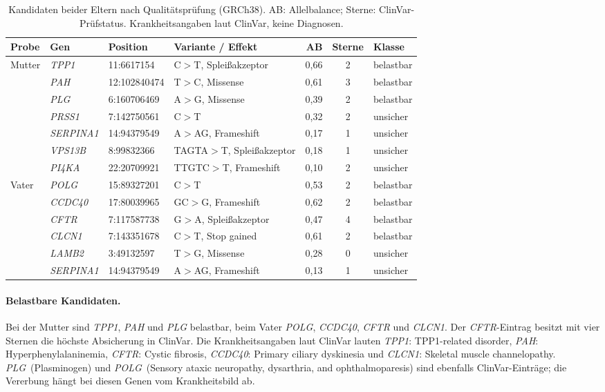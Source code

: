 \documentclass[10pt,a4paper,twocolumn]{article}
\newcommand{\gene}[1]{\textit{#1}}
\begin{document}
\begin{table}[t]
\centering
\small
\caption{Kandidaten beider Eltern nach Qualit\"atspr\"ufung (GRCh38). AB: Allelbalance; Sterne: ClinVar-Pr\"ufstatus. Krankheitsangaben laut ClinVar, keine Diagnosen.}
\label{tab:kand}
\begin{tabular}{@{}llllrcl@{}}
\toprule
Probe & Gen & Position & Variante / Effekt & AB & Sterne & Klasse\\
\midrule
Mutter & \gene{TPP1} & 11:6617154 & C$>$T, Spleißakzeptor & 0,66 & 2 & belastbar\\
 & \gene{PAH} & 12:102840474 & T$>$C, Missense & 0,61 & 3 & belastbar\\
 & \gene{PLG} & 6:160706469 & A$>$G, Missense & 0,39 & 2 & belastbar\\
 & \gene{PRSS1} & 7:142750561 & C$>$T & 0,32 & 2 & unsicher\\
 & \gene{SERPINA1} & 14:94379549 & A$>$AG, Frameshift & 0,17 & 1 & unsicher\\
 & \gene{VPS13B} & 8:99832366 & TAGTA$>$T, Spleißakzeptor & 0,18 & 1 & unsicher\\
 & \gene{PI4KA} & 22:20709921 & TTGTC$>$T, Frameshift & 0,10 & 2 & unsicher\\
\addlinespace
Vater & \gene{POLG} & 15:89327201 & C$>$T & 0,53 & 2 & belastbar\\
 & \gene{CCDC40} & 17:80039965 & GC$>$G, Frameshift & 0,62 & 2 & belastbar\\
 & \gene{CFTR} & 7:117587738 & G$>$A, Spleißakzeptor & 0,47 & 4 & belastbar\\
 & \gene{CLCN1} & 7:143351678 & C$>$T, Stop gained & 0,61 & 2 & belastbar\\
 & \gene{LAMB2} & 3:49132597 & T$>$G, Missense & 0,28 & 0 & unsicher\\
 & \gene{SERPINA1} & 14:94379549 & A$>$AG, Frameshift & 0,13 & 1 & unsicher\\
\bottomrule
\end{tabular}
\end{table}

\paragraph{Belastbare Kandidaten.} Bei der Mutter sind \gene{TPP1}, \gene{PAH} und \gene{PLG} belastbar, beim Vater \gene{POLG}, \gene{CCDC40}, \gene{CFTR} und \gene{CLCN1}. Der \gene{CFTR}-Eintrag besitzt mit vier Sternen die h\"ochste Absicherung in ClinVar. Die Krankheitsangaben laut ClinVar lauten \gene{TPP1}: TPP1-related disorder, \gene{PAH}: Hyperphenylalaninemia, \gene{CFTR}: Cystic fibrosis, \gene{CCDC40}: Primary ciliary dyskinesia und \gene{CLCN1}: Skeletal muscle channelopathy. \gene{PLG}~(Plasminogen) und \gene{POLG}~(Sensory ataxic neuropathy, dysarthria, and ophthalmoparesis) sind ebenfalls ClinVar-Eintr\"age; die Vererbung h\"angt bei diesen Genen vom Krankheitsbild ab.
\end{document}
